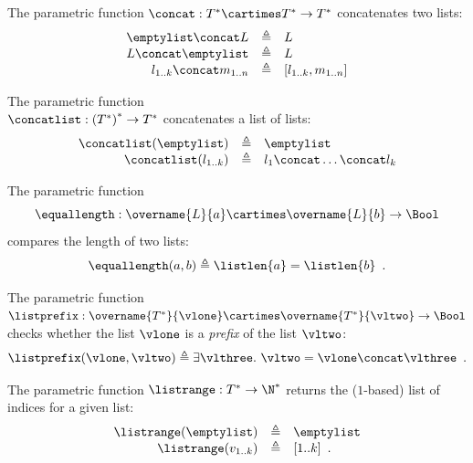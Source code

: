 \hypertarget{def-concat}{}
\begin{definition}
The parametric function $\concat : T^* \cartimes T^* \rightarrow T^*$ concatenates two lists:
\[
    \begin{array}{rcl}
    \emptylist \concat L &\triangleq& L\\
    L \concat \emptylist &\triangleq& L\\
    l_{1..k} \concat m_{1..n} &\triangleq& [l_{1..k}, m_{1..n}]
    \end{array}
\]
\end{definition}

\hypertarget{def-concatlist}{}
\begin{definition}
The parametric function\\
$\concatlist : \left(T^*\right)^* \rightarrow T^*$ concatenates a list of lists:
\[
  \begin{array}{rcl}
    \concatlist(\emptylist) &\triangleq& \emptylist\\
    \concatlist(l_{1..k}) &\triangleq& l_1 \concat \ldots \concat l_k \\
  \end{array}
\]
\end{definition}

\hypertarget{def-equallength}{}
\begin{definition}
The parametric function
\[
  \equallength : \overname{L}{a} \cartimes \overname{L}{b} \rightarrow \Bool
\]
compares the length of two lists:
\[
\equallength(a, b) \triangleq \listlen{a}=\listlen{b} \enspace.
\]
\end{definition}

\hypertarget{def-listprefix}{}
\begin{definition}
The parametric function $\listprefix : \overname{T^*}{\vlone} \cartimes \overname{T^*}{\vltwo} \rightarrow \Bool$ checks whether
the list $\vlone$ is a \emph{prefix} of the list $\vltwo$:
\[
\listprefix(\vlone, \vltwo) \triangleq \exists \vlthree.\ \vltwo = \vlone \concat \vlthree \enspace.
\]
\end{definition}

\hypertarget{def-listrange}{}
\begin{definition}
The parametric function $\listrange : T^* \rightarrow \N^*$ returns the ($1$-based) list of indices for a given list:
\[
    \begin{array}{rcl}
        \listrange(\emptylist) &\triangleq& \emptylist\\
        \listrange(v_{1..k}) &\triangleq& [1..k] \enspace.
    \end{array}
\]
\end{definition}

